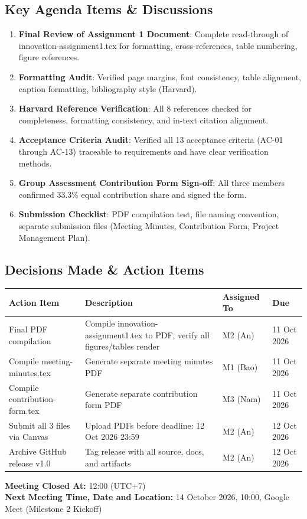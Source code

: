 \documentclass[11pt, a4paper]{article}
\begin{document}
\subsection*{Key Agenda Items \& Discussions}
\begin{enumerate}
  \item \textbf{Final Review of Assignment 1 Document}: Complete read-through of innovation-assignment1.tex for formatting, cross-references, table numbering, figure references.
  \item \textbf{Formatting Audit}: Verified page margins, font consistency, table alignment, caption formatting, bibliography style (Harvard).
  \item \textbf{Harvard Reference Verification}: All 8 references checked for completeness, formatting consistency, and in-text citation alignment.
  \item \textbf{Acceptance Criteria Audit}: Verified all 13 acceptance criteria (AC-01 through AC-13) traceable to requirements and have clear verification methods.
  \item \textbf{Group Assessment Contribution Form Sign-off}: All three members confirmed 33.3\% equal contribution share and signed the form.
  \item \textbf{Submission Checklist}: PDF compilation test, file naming convention, separate submission files (Meeting Minutes, Contribution Form, Project Management Plan).
\end{enumerate}

\subsection*{Decisions Made \& Action Items}

\begin{table}[H]
  \centering
  \scriptsize
  \begin{tabularx}{\linewidth}{@{}L{6cm} L{3cm} L{2cm} L{2cm}@{}}
    \toprule
    \textbf{Action Item} & \textbf{Description} & \textbf{Assigned To} & \textbf{Due} \\
    \midrule
    Final PDF compilation & Compile innovation-assignment1.tex to PDF, verify all figures/tables render & M2 (An) & 11 Oct 2026 \\
    Compile meeting-minutes.tex & Generate separate meeting minutes PDF & M1 (Bao) & 11 Oct 2026 \\
    Compile contribution-form.tex & Generate separate contribution form PDF & M3 (Nam) & 11 Oct 2026 \\
    Submit all 3 files via Canvas & Upload PDFs before deadline: 12 Oct 2026 23:59 & M2 (An) & 12 Oct 2026 \\
    Archive GitHub release v1.0 & Tag release with all source, docs, and artifacts & M2 (An) & 12 Oct 2026 \\
    \bottomrule
  \end{tabularx}
\end{table}

\vspace{0.3cm}
\noindent \textbf{Meeting Closed At:} 12:00 (UTC+7)\\
\textbf{Next Meeting Time, Date and Location:} 14 October 2026, 10:00, Google Meet (Milestone 2 Kickoff)
\end{document}
